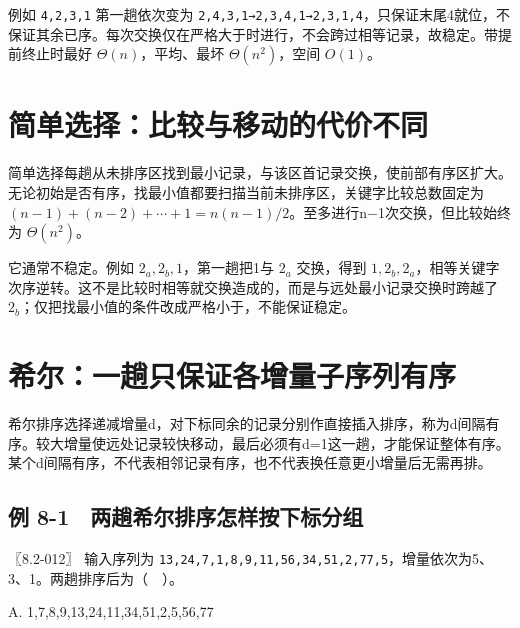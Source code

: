 例如 \allowbreak{}\texttt{4,}\allowbreak{}\texttt{2,}\allowbreak{}\texttt{3,}\allowbreak{}\texttt{1} 第一趟依次变为 \allowbreak{}\texttt{2,}\allowbreak{}\texttt{4,}\allowbreak{}\texttt{3,}\allowbreak{}\texttt{1→2,}\allowbreak{}\texttt{3,}\allowbreak{}\texttt{4,}\allowbreak{}\texttt{1→2,}\allowbreak{}\texttt{3,}\allowbreak{}\texttt{1,}\allowbreak{}\texttt{4}，只保证末尾4就位，不保证其余已序。每次交换仅在严格大于时进行，不会跨过相等记录，故稳定。带提前终止时最好 \(\Theta(n)\)，平均、最坏 \(\Theta(n^2)\)，空间 \(O(1)\)。

\section{简单选择：比较与移动的代价不同}\label{ds-08-04}

简单选择每趟从未排序区找到最小记录，与该区首记录交换，使前部有序区扩大。无论初始是否有序，找最小值都要扫描当前未排序区，关键字比较总数固定为 \((n-1)+(n-2)+\cdots+1=n(n-1)/2\)。至多进行n−1次交换，但比较始终为 \(\Theta(n^2)\)。

它通常不稳定。例如 \(2_a,2_b,1\)，第一趟把1与 \(2_a\) 交换，得到 \(1,2_b,2_a\)，相等关键字次序逆转。这不是比较时相等就交换造成的，而是与远处最小记录交换时跨越了 \(2_b\)；仅把找最小值的条件改成严格小于，不能保证稳定。

\section{希尔：一趟只保证各增量子序列有序}\label{ds-08-05}

希尔排序选择递减增量d，对下标同余的记录分别作直接插入排序，称为d间隔有序。较大增量使远处记录较快移动，最后必须有d=1这一趟，才能保证整体有序。某个d间隔有序，不代表相邻记录有序，也不代表换任意更小增量后无需再排。

\subsection{例 8-1　两趟希尔排序怎样按下标分组}\label{ds-ex8-1}

\noindent{}〖8.2-012〗 输入序列为 \allowbreak{}\texttt{13,}\allowbreak{}\texttt{24,}\allowbreak{}\texttt{7,}\allowbreak{}\texttt{1,}\allowbreak{}\texttt{8,}\allowbreak{}\texttt{9,}\allowbreak{}\texttt{11,}\allowbreak{}\texttt{56,}\allowbreak{}\texttt{34,}\allowbreak{}\texttt{51,}\allowbreak{}\texttt{2,}\allowbreak{}\texttt{77,}\allowbreak{}\texttt{5}，增量依次为5、3、1。两趟排序后为（　）。

A. 1,7,8,9,13,24,11,34,51,2,5,56,77

